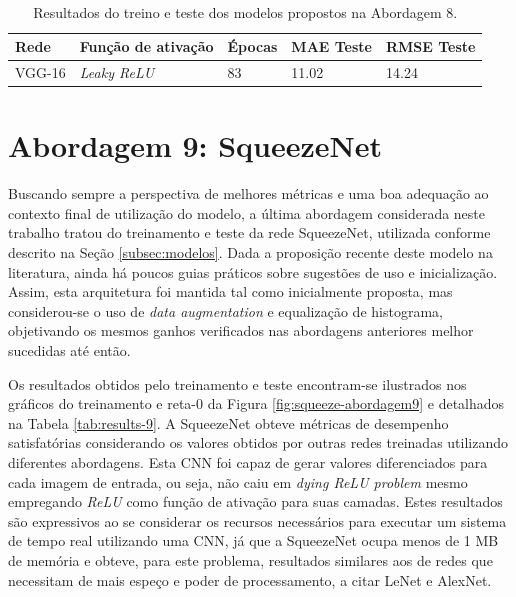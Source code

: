 \begin{figure}[h!]
\begin{subfigure}[hb]{0.5\linewidth}
	 \end{subfigure}\\
 \end{figure}

\begin{table}[!ht]
\centering
\caption{Resultados do treino e teste dos modelos propostos na Abordagem 8.}
\label{tab:results-8}
 \begin{tabular}{l l l l l }
	 \toprule
	 Rede & Função de ativação & Épocas & MAE Teste & RMSE Teste \\
	 \midrule
	 VGG-16 & \emph{Leaky ReLU} & 83 & 11.02 & 14.24 \\
	 \bottomrule
 \end{tabular}
\end{table}


\section{Abordagem 9: SqueezeNet}

	Buscando sempre a perspectiva de melhores métricas e uma boa adequação ao contexto final de utilização do modelo, a última abordagem considerada neste trabalho tratou do treinamento e teste da rede SqueezeNet, utilizada conforme  descrito na Seção \ref{subsec:modelos}. Dada a proposição recente deste modelo na literatura, ainda há poucos guias práticos sobre sugestões de uso e inicialização. Assim, esta arquitetura foi mantida tal como inicialmente proposta, mas considerou-se o uso de \emph{data augmentation} e equalização de histograma, objetivando os mesmos ganhos verificados nas abordagens anteriores melhor sucedidas até então.

	Os resultados obtidos pelo treinamento e teste encontram-se ilustrados nos gráficos do treinamento e reta-0 da Figura \ref{fig:squeeze-abordagem9} e detalhados na Tabela \ref{tab:results-9}. A SqueezeNet obteve métricas de desempenho satisfatórias considerando os valores obtidos por outras redes treinadas utilizando diferentes abordagens. Esta CNN foi capaz de gerar valores diferenciados para cada imagem de entrada, ou seja, não caiu em \emph{dying ReLU problem} mesmo empregando \emph{ReLU} como função de ativação para suas camadas. Estes resultados são expressivos ao se considerar os recursos necessários para executar um sistema de tempo real utilizando uma CNN, já que a SqueezeNet ocupa menos de 1 MB de memória \cite{squeezenet} e obteve, para este problema, resultados similares aos de redes que necessitam de mais espeço e poder de processamento, a citar LeNet e AlexNet.

